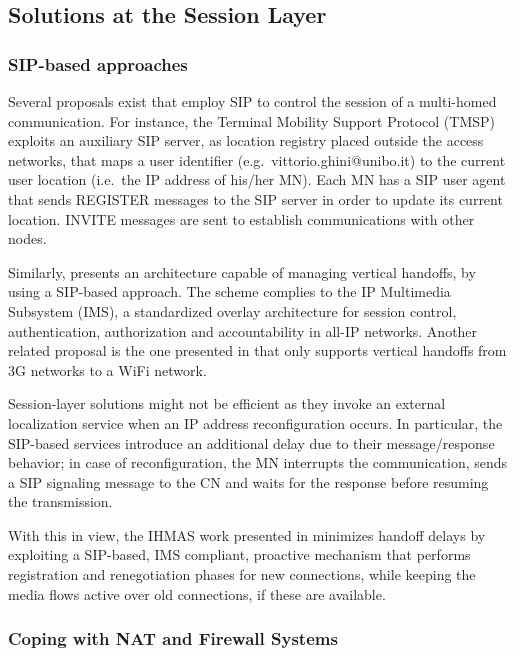 \documentclass[preprint,12pt]{elsarticle}
\begin{document}
\subsection{Solutions at the Session Layer}

\subsubsection{SIP-based approaches}
Several proposals exist that employ SIP to control the session of 
a multi-homed communication. For instance, the Terminal Mobility Support 
Protocol (TMSP) \cite{LimYLL09} exploits an auxiliary SIP server, as location 
registry placed outside the access networks, that maps a user identifier (e.g.~vittorio.ghini@unibo.it) to the current user location (i.e.~the IP address of his/her  
MN). 
Each MN has a SIP user agent that sends REGISTER messages to the SIP server in 
order to update its current location. INVITE messages are sent to establish 
communications with other nodes. 

Similarly, \cite{Udugama:2007} presents an architecture capable of managing vertical 
handoffs, by using a SIP-based approach. The scheme complies to the IP 
Multimedia Subsystem (IMS), a standardized overlay architecture for session 
control, authentication, authorization and accountability in all-IP networks.  
Another related proposal is the one presented in \cite{Kalmanek:2006} that only 
supports vertical handoffs from 3G networks to a WiFi network.

Session-layer solutions might not be efficient as they invoke an external 
localization service when an IP address reconfiguration occurs. In particular, 
the SIP-based services introduce an additional delay due to their 
message/response behavior; in case of reconfiguration, the MN interrupts the 
communication, sends a SIP signaling message to the CN and waits for the 
response before resuming the transmission.  

With this in view, the IHMAS work presented in \cite{Bellavista:2010} 
minimizes handoff delays by exploiting a SIP-based, IMS compliant, proactive 
mechanism that performs registration and renegotiation phases for new 
connections, while keeping the media flows active over old connections, if these 
are available. 

\subsubsection{Coping with NAT and Firewall Systems}
\end{document}
